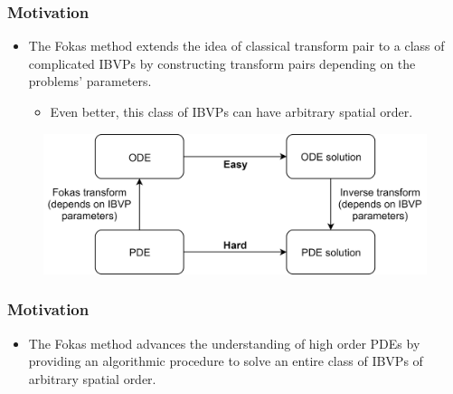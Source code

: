\documentclass{beamer}
\begin{document}
\begin{frame}
    \frametitle{Motivation}
    \begin{itemize}
        \item The Fokas method extends the idea of classical transform pair to a class of complicated IBVPs by constructing transform pairs depending on the problems' parameters.
        \begin{itemize}
            \item Even better, this class of IBVPs can have arbitrary spatial order.
        \end{itemize}
    \end{itemize}
    \begin{figure}[htpb!]
        \centering
        \includegraphics[width=1\textwidth]{fokas_transform.png}
        \label{fig:fokas_transform}
    \end{figure}
\end{frame}

\begin{frame}[t]
    \frametitle{Motivation}
    \begin{itemize}
        \item The Fokas method advances the understanding of high order PDEs by providing an algorithmic procedure to solve an entire class of IBVPs of arbitrary spatial order.
    \end{itemize}
\end{frame}
\end{document}
